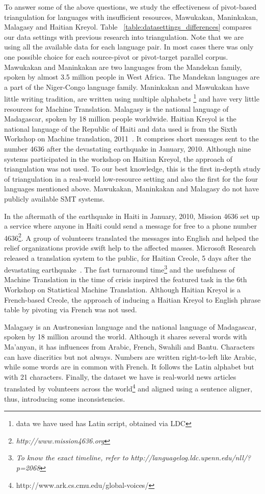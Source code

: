 \documentclass[11pt]{article}
\begin{document}
To answer some of the above questions, we study the effectiveness of pivot-based triangulation for languages with insufficient resources, Mawukakan, Maninkakan, Malagasy and Haitian Kreyol. Table ~\ref{table:datasettings_differences} compares our data settings with previous research into triangulation. Note that we are using all the available data for each language pair. In most cases there was only one possible choice for each source-pivot or pivot-target parallel corpus. Mawukakan and Maninkakan are two languages from the Mandekan family, spoken by almost 3.5 million people in West Africa. The Mandekan languages are a part of the Niger-Congo language family. Maninkakan and Mawukakan have little writing tradition, are written using multiple alphabets \footnote{data we have used has Latin script, obtained via LDC} and have very little resources for Machine Translation. Malagasy is the national language of Madagascar, spoken by 18 million people worldwide. Haitian Kreyol is the national language of the Republic of Haiti and data used is from the Sixth Workshop on Machine translation, 2011~\cite{WMT:11}. It comprises short messages sent to the number 4636 after the devastating earthquake in January, 2010. Although nine systems participated in the workshop on Haitian Kreyol, the approach of triangulation was not used. To our best knowledge, this is the first in-depth study of triangulation in a real-world low-resource setting and also the first for the four languages mentioned above. Mawukakan, Maninkakan and Malagasy do not have publicly available SMT systems. 

In the aftermath of the earthquake in Haiti in January, 2010, Mission 4636 set up a service where anyone in Haiti could send a message for free to a phone number 4636\footnote{\emph{http://www.mission4636.org}}. A group of volunteers translated the messages into English and helped the relief organizations provide swift help to the affected masses. Microsoft Research released a translation system to the public, for Haitian Creole, 5 days after the devastating earthquake~\cite{Lewis:11}. The fast turnaround time\footnote{\emph{To know the exact timeline, refer to http://languagelog.ldc.upenn.edu/nll/?p=2068}} and the usefulness of Machine Translation in the time of crisis inspired the featured task in the 6th Workshop on Statistical Machine Translation. Although Haitian Kreyol is a French-based Creole, the approach of inducing a Haitian Kreyol to English phrase table by pivoting via French was not used.

Malagasy is an Austronesian language and the national language of Madagascar, spoken by 18 million around the world. Although it shares several words with Ma'anyan, it has influences from Arabic, French, Swahili and Bantu. Characters can have diacritics but not always. Numbers are written right-to-left like Arabic, while some words are in common with French. It follows the Latin alphabet but with 21 characters. Finally, the dataset we have is real-world news articles translated by volunteers across the world\footnote{http://www.ark.cs.cmu.edu/global-voices/} and aligned using a sentence aligner, thus, introducing some inconsistencies. 
\end{document}
